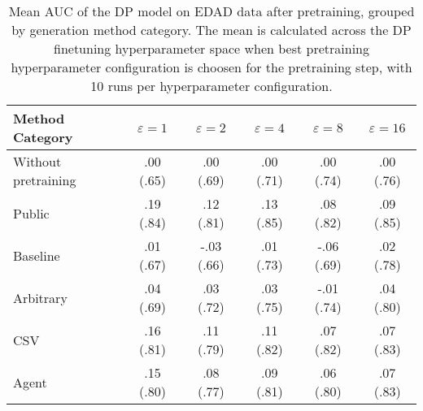 \begin{table}[h!]
    \centering
    \caption{Mean AUC of the DP model on EDAD data after pretraining, grouped by generation method category. The mean is calculated across the DP finetuning hyperparameter space when best pretraining hyperparameter configuration is choosen for the pretraining step, with 10 runs per hyperparameter configuration.}
    \label{tab:epsilon_comparison}
    \begin{tabular}{lccccc}
    \toprule
    Method Category & $\varepsilon=1$ & $\varepsilon=2$ & $\varepsilon=4$ & $\varepsilon=8$ & $\varepsilon=16$ \\
    \midrule
    Without pretraining & .00 {\small (.65)} & .00 {\small (.69)} & .00 {\small (.71)} & .00 {\small (.74)} & .00 {\small (.76)} \\
    \arrayrulecolor{black!50!}\midrule
    Public & \cellcolor{gold!30}.19 {\small (.84)} & \cellcolor{gold!30}.12 {\small (.81)} & \cellcolor{gold!30}.13 {\small (.85)} & \cellcolor{gold!30}.08 {\small (.82)} & \cellcolor{gold!30}.09 {\small (.85)} \\
    \arrayrulecolor{black!50!}\midrule
    Baseline & .01 {\small (.67)} & -.03 {\small (.66)} & .01 {\small (.73)} & -.06 {\small (.69)} & .02 {\small (.78)} \\
    \arrayrulecolor{black!50!}\midrule
    Arbitrary & .04 {\small (.69)} & .03 {\small (.72)} & .03 {\small (.75)} & -.01 {\small (.74)} & .04 {\small (.80)} \\
    \arrayrulecolor{black!50!}\midrule
    CSV & \cellcolor{silver!30}.16 {\small (.81)} & \cellcolor{silver!30}.11 {\small (.79)} & \cellcolor{silver!30}.11 {\small (.82)} & \cellcolor{silver!30}.07 {\small (.82)} & \cellcolor{silver!30}.07 {\small (.83)} \\
    Agent & \cellcolor{bronze!30}.15 {\small (.80)} & \cellcolor{bronze!30}.08 {\small (.77)} & \cellcolor{bronze!30}.09 {\small (.81)} & \cellcolor{bronze!30}.06 {\small (.80)} & \cellcolor{bronze!30}.07 {\small (.83)} \\
    \bottomrule
    \end{tabular}
\end{table}